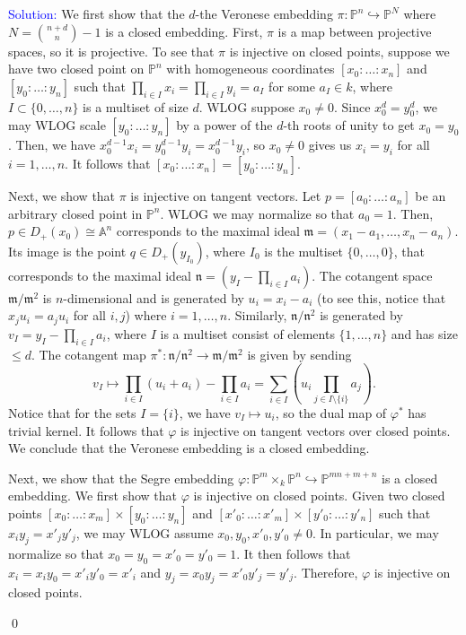 \documentclass[11pt]{article}
\renewcommand{\AA}{\mathbb{A}}
\newcommand{\PP}{\mathbb{P}}
\newcommand{\km}{\mathfrak{m}}
\newcommand{\kn}{\mathfrak{n}}
\newenvironment{solution}{\begin{trivlist}\item[]{\textcolor{blue}{Solution:}}}{\qed \end{trivlist}}
\begin{document}
\begin{solution}
    We first show that the $d$-the Veronese embedding $\pi: \PP^n \hookrightarrow \PP^{N}$ where $N = \binom{n+d}{n} - 1$ is a closed embedding. First, $\pi$ is a map between projective spaces, so it is projective. To see that $\pi$ is injective on closed points, suppose we have two closed point on $\PP^n$ with homogeneous coordinates $[x_0 : \ldots : x_n]$ and $[y_0: \ldots: y_n]$ such that $\prod_{i \in I} x_i = \prod_{i \in I} y_i = a_I$ for some $a_I \in k$, where $I \subset \{0, \ldots, n\}$ is a multiset of size $d$. WLOG suppose $x_0 \neq 0$. Since $x_0^d = y_0^d$, we may WLOG scale $[y_0: \ldots: y_n]$ by a power of the $d$-th roots of unity to get $x_0 = y_0$. Then, we have $x_0^{d-1}x_i = y_0^{d-1} y_i = x_0^{d-1}y_i$, so $x_0 \neq 0$ gives us $x_i = y_i$ for all $i = 1, \ldots, n$. It follows that $[x_0: \ldots: x_n] = [y_0: \ldots: y_n]$. 
    
    Next, we show that $\pi$ is injective on tangent vectors. Let $p = [a_0: \ldots: a_n]$ be an arbitrary closed point in $\PP^n$. WLOG we may normalize so that $a_0 = 1$. Then, $p \in D_+(x_0) \cong \AA^n$ corresponds to the maximal ideal $\km = (x_1 - a_1, \ldots, x_n - a_n)$. Its image is the point $q \in D_+(y_{I_0})$, where $I_0$ is the multiset $\{0, \ldots, 0\}$, that corresponds to the maximal ideal $\kn = (y_I - \prod_{i \in I}a_i)$. The cotangent space $\km / \km^2$ is $n$-dimensional and is generated by $u_i = x_i - a_i$ (to see this, notice that $x_ju_i = a_j u_i$ for all $i,j$) where $i = 1, \ldots, n$. Similarly, $\kn / \kn^2$ is generated by $v_I = y_I - \prod_{i \in I} a_i$, where $I$ is a multiset consist of elements $\{1, \ldots, n\}$ and has size $\leq d$. The cotangent map $\pi^*: \kn / \kn^2 \rightarrow \km / \km^2$ is given by sending 
    \[
        v_I \mapsto \prod_{i \in I} (u_i + a_i) - \prod_{i \in I} a_i 
        = \sum_{i\in I} \left( u_i \prod_{j \in I \setminus \{i\}} a_j \right). 
    \]
    Notice that for the sets $I = \{i\}$, we have $v_I \mapsto u_i$, so the dual map of $\varphi^*$ has trivial kernel. It follows that $\varphi$ is injective on tangent vectors over closed points. We conclude that the Veronese embedding is a closed embedding.

    Next, we show that the Segre embedding $\varphi: \PP^m \times_k \PP^n \hookrightarrow \PP^{mn + m + n}$ is a closed embedding. We first show that $\varphi$ is injective on closed points. Given two closed points $[x_0 : \ldots : x_m] \times [y_0 : \ldots : y_n]$ and $[x'_0 : \ldots : x'_m] \times [y'_0 : \ldots : y'_n]$ such that $x_iy_j = x'_j y'_j$, we may WLOG assume $x_0, y_0, x'_0, y'_0 \neq 0$. In particular, we may normalize so that $x_0 = y_0 = x'_0 = y'_0 = 1$. It then follows that $x_i = x_iy_0 = x'_i y'_0 = x'_i$ and $y_j = x_0 y_j = x'_0 y'_j = y'_j$. Therefore, $\varphi$ is injective on closed points. 


\end{solution}
\end{document}
